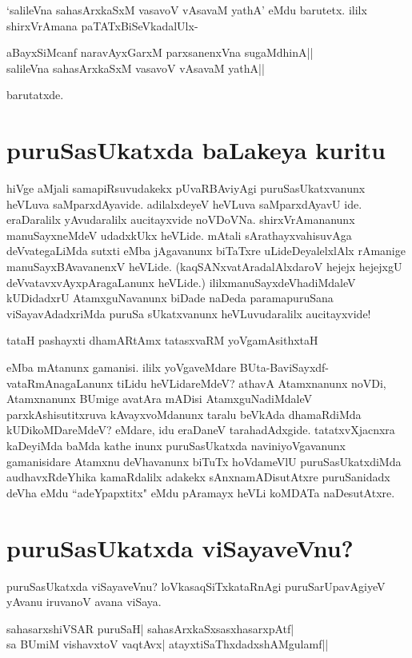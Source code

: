 `salileVna sahasArxkaSxM vasavoV vAsavaM yathA' eMdu barutetx. ililx shirxVrAmana paTATxBiSeVkadalUlx-

\begin{shloka}
aBayxSiMcanf naravAyxGarxM parxsanenxVna sugaMdhinA||\label{248a}\\
salileVna sahasArxkaSxM vasavoV vAsavaM yathA||\label{248b}
\end{shloka}

barutatxde.

\section*{puruSasUkatxda baLakeya kuritu}

hiVge aMjali samapiRsuvudakekx pUvaRBAviyAgi puruSasUkatxvanunx heVLuva saMparxdAyavide. adilalxdeyeV heVLuva saMparxdAyavU ide. eraDaralilx yAvudaralilx aucitayxvide noVDoVNa. shirxVrAmananunx manuSayxneMdeV udadxkUkx heVLide. mAtali sArathayxvahisuvAga deVvategaLiMda sutxti eMba jAgavanunx biTaTxre uLideDeyalelxlAlx rAmanige manuSayxBAvavanenxV heVLide. (kaqSANxvatAradalAlxdaroV hejejx hejejxgU deVvatavxvAyxpAragaLanunx heVLide.) ililxmanuSayxdeVhadiMdaleV kUDidadxrU AtamxguNavanunx biDade naDeda paramapuruSana viSayavAdadxriMda puruSa sUkatxvanunx heVLuvudaralilx aucitayxvide!

\begin{shloka}
tataH pashayxti dhamARtAmx tatasxvaRM yoVgamAsithxtaH\label{248}
\end{shloka}

eMba mAtanunx gamanisi. ililx yoVgaveMdare BUta-BaviSayxdf-vataRmAnagaLanunx tiLidu heVLidareMdeV? athavA Atamxnanunx noVDi, Atamxnanunx BUmige avatAra mADisi AtamxguNadiMdaleV parxkAshisutitxruva kAvayxvoMdanunx taralu beVkAda dhamaRdiMda kUDikoMDareMdeV? eMdare, idu eraDaneV tarahadAdxgide. tatatxvXjacnxra kaDeyiMda baMda kathe inunx puruSasUkatxda naviniyoVgavanunx gamanisidare Atamxnu deVhavanunx biTuTx hoVdameVlU puruSasUkatxdiMda audhavxRdeYhika kamaRdalilx adakekx sAnxnamADisutAtxre puruSanidadx deVha eMdu ``adeYpapxtitx" eMdu pAramayx heVLi koMDATa naDesutAtxre. 

\section*{puruSasUkatxda viSayaveVnu?}

puruSasUkatxda viSayaveVnu? loVkasaqSiTxkataRnAgi puruSarUpavAgiyeV yAvanu iruvanoV avana viSaya. 

\begin{shloka}
sahasarxshiVSAR puruSaH| sahasArxkaSxsasxhasarxpAtf|\label{249d}\\
sa BUmiM vishavxtoV vaqtAvx| atayxtiSaThxdadxshAMgulamf||
\end{shloka}


